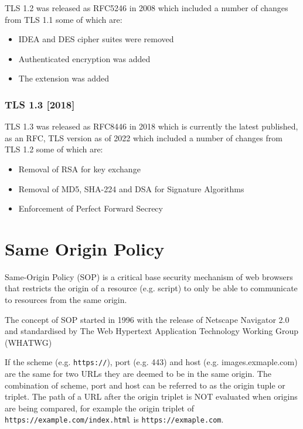 \documentclass{mscreport}
\begin{document}
TLS 1.2 was released as RFC5246 in 2008 \cite{Dierks2008-uy} which included a number of changes from TLS 1.1 some of which are:
\begin{itemize}
	\setlength\itemsep{0.1em}
	\item IDEA and DES cipher suites were removed
	\item Authenticated encryption was added
	\item The extension \texttt{} was added
\end{itemize}


\subsubsection{TLS 1.3 [2018]}

TLS 1.3 was released as RFC8446 in 2018 \cite{Rescorla2018-wb} which is currently the latest published, as an RFC, TLS version as of 2022 which included a number of changes from TLS 1.2 some of which are:
\begin{itemize}
	\setlength\itemsep{0.1em}
	\item Removal of RSA for key exchange
	\item Removal of MD5, SHA-224 and DSA for Signature Algorithms
	\item Enforcement of Perfect Forward Secrecy
\end{itemize}

\newpage

\section{Same Origin Policy}
\label{section:same_origin_policy}
\vspace{0.3cm}
\noindent
Same-Origin Policy (SOP) is a critical base security mechanism of web browsers that restricts the origin of a resource (e.g. script) to only be able to communicate to resources from the same origin.

\vspace{0.3cm}
\noindent
The concept of SOP started in 1996 with the release of Netscape Navigator 2.0 \cite{Preston2012-cs} and standardised by The Web Hypertext Application Technology Working Group (WHATWG) \cite{Multiple1996-ju}

\vspace{0.3cm}
\noindent
If the scheme (e.g. \texttt{https://}), port (e.g. 443) and host (e.g. images.exmaple.com) are the same for two URLs they are deemed to be in the same origin. The combination of scheme, port and host can be referred to as the origin tuple or triplet. The path of a URL after the origin triplet is NOT evaluated when origins are being compared, for example the origin triplet of \texttt{https://example.com/index.html} is \texttt{https://exmaple.com}.
\end{document}
